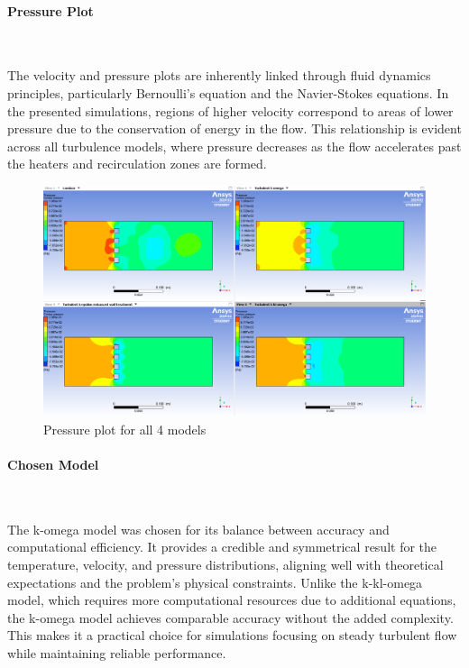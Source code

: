 \paragraph{Pressure Plot}~

The velocity and pressure plots are inherently linked through fluid dynamics principles, particularly Bernoulli's equation and the Navier-Stokes equations. In the presented simulations, regions of higher velocity correspond to areas of lower pressure due to the conservation of energy in the flow. This relationship is evident across all turbulence models, where pressure decreases as the flow accelerates past the heaters and recirculation zones are formed.

\begin{figure}[h]   
    \centering
    \includegraphics[width=1\textwidth]{img/Pressure_plot_comparison.png}
    \caption{Pressure plot for all 4 models}
    \label{fig:press_plot}
\end{figure}

\paragraph{Chosen Model}~

The k-omega model was chosen for its balance between accuracy and computational efficiency. It provides a credible and symmetrical result for the temperature, velocity, and pressure distributions, aligning well with theoretical expectations and the problem's physical constraints. Unlike the k-kl-omega model, which requires more computational resources due to additional equations, the k-omega model achieves comparable accuracy without the added complexity. This makes it a practical choice for simulations focusing on steady turbulent flow while maintaining reliable performance.


